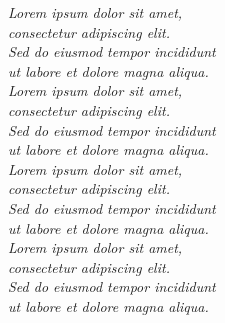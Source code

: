 \vspace*{3cm}

\thispagestyle{empty}
\begin{center}
   \hfill \emph{Lorem ipsum dolor sit amet, \\\hfill consectetur adipiscing elit. \\\hfill Sed do eiusmod tempor incididunt \\\hfill ut labore et dolore magna aliqua.\\
   \vspace*{2cm}\hfill
   Lorem ipsum dolor sit amet, \\\hfill consectetur adipiscing elit. \\\hfill Sed do eiusmod tempor incididunt \\\hfill ut labore et dolore magna aliqua.\\
   \vspace*{2cm}\hfill
   Lorem ipsum dolor sit amet, \\\hfill consectetur adipiscing elit. \\\hfill Sed do eiusmod tempor incididunt \\\hfill ut labore et dolore magna aliqua.\\
\vspace*{2cm}\hfill
Lorem ipsum dolor sit amet, \\\hfill consectetur adipiscing elit. \\\hfill Sed do eiusmod tempor incididunt \\\hfill ut labore et dolore magna aliqua.\\}
\end{center}